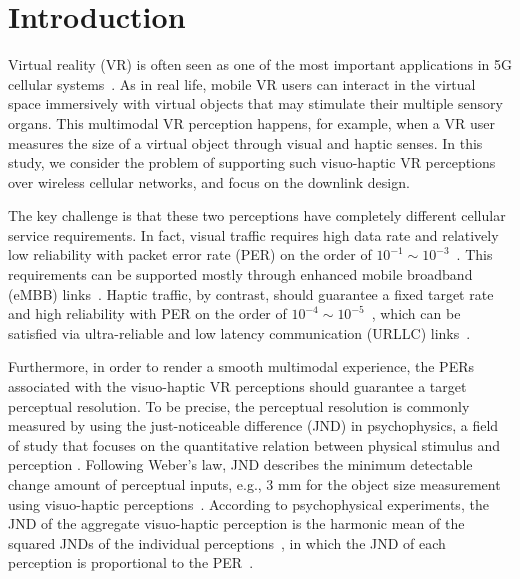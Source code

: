 \documentclass[conference]{IEEEtran}
\begin{document}
\section{Introduction}
Virtual reality (VR) is often seen as one of the most important applications in 5G cellular systems~\cite{ABIQualcommVR:17,EjderVR:17,ParkWCL:18}. As in real life, mobile VR users can interact in the virtual space immersively with virtual objects that may stimulate their multiple sensory organs. This multimodal VR perception happens, for example, when a VR user measures the size of a virtual object through visual and haptic senses. In this study, we consider the problem of supporting such visuo-haptic VR perceptions over wireless cellular networks, and focus on the downlink design.


The key challenge is that these two perceptions have completely different cellular service requirements. In fact, visual traffic requires high data rate and relatively low reliability with packet error rate (PER) on the order of $10^{-1}\sim 10^{-3}$~\cite{Shi:10,UR2Cspaswin:17}. This requirements can be supported mostly through enhanced mobile broadband (eMBB) links~\cite{ITU5G:15}. Haptic traffic, by contrast, should guarantee a fixed target rate and high reliability with PER on the order of $10^{-4}\sim 10^{-5}$~\cite{Steinbach:12,Zhang:18}, which can be satisfied via ultra-reliable and low latency communication (URLLC) links~\cite{PetarURLLC:17,MehdiURLLC:18}.

Furthermore, in order to render a smooth multimodal experience, the PERs associated with the visuo-haptic VR perceptions should guarantee a target perceptual resolution. To be precise, the perceptual resolution is commonly measured by using the just-noticeable difference (JND) in psychophysics, a field of study that focuses on the quantitative relation between physical stimulus and perception \cite{Ernst:2002aa,Shi:10,ShiHirche:16}. Following Weber's law, JND describes the minimum detectable change amount of perceptual inputs, e.g., $3$ mm for the object size measurement using visuo-haptic perceptions~\cite{Ernst:2002aa}. According to psychophysical experiments, the JND of the aggregate visuo-haptic perception is the harmonic mean of the squared JNDs of the individual perceptions~\cite{Ernst:2002aa}, in which the JND of each perception is proportional to the PER~\cite{Shi:10}. 
\end{document}
